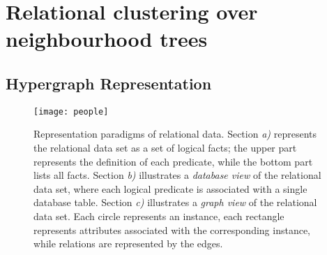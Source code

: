 \section{Relational clustering over neighbourhood trees}
\label{sec:Approach}



\subsection{Hypergraph Representation}

\begin{figure}
  \centering
  \medskip
  \texttt{[image: people]}
  \caption{Representation paradigms of relational data. Section \textit{a)} represents the relational data set as a set of logical facts; the upper part represents the definition of each predicate, while the bottom part lists all facts. Section \textit{b)} illustrates a \textit{database view} of the relational data set, where each logical predicate is associated with a single database table.  Section \textit{c)}  illustrates a \textit{graph view} of the relational data set. Each circle represents an instance, each rectangle represents attributes associated with the corresponding instance, while relations are represented by the edges.}
  \label{fig:clustering:people}
\end{figure}

